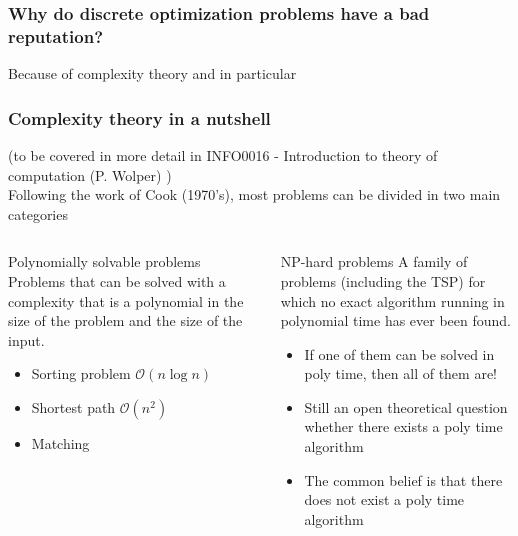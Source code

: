 \documentclass[9pt,handout]{beamer}
\begin{document}
\begin{frame}
\frametitle{Why do discrete optimization problems have a bad reputation?}
Because of complexity theory and in particular 
\vspace{2cm}

\begin{center}
\begin{huge}
\end{huge}
\end{center}
\end{frame}
\begin{frame}
\frametitle{Complexity theory in a nutshell}
(to be covered in more detail in INFO0016 - Introduction to theory of computation (P. Wolper) )\\
Following the work of Cook (1970's), most problems can be divided in two main categories
\begin{columns}[t]
\begin{column}{5.25cm}
\begin{exampleblock}{Polynomially solvable problems}
Problems that can be solved with a complexity
that is a polynomial in the \alert{size} of the problem
and the \alert{size of the input}.\bigskip
\begin{itemize}
\item<1-> Sorting problem $\mathcal O(n\log n)$
\item<1-> Shortest path $\mathcal O(n^2)$
\item<1-> Matching 
\end{itemize}
\end{exampleblock}
\end{column}
\begin{column}{5.25cm}
\begin{alertblock}{NP-hard problems}
A family of problems (including the TSP) for which no exact algorithm
running in polynomial time has ever been found.
\begin{itemize}
\item<2-> If one of them can be solved in poly time, then all of them are!
\item<2-> Still an open theoretical question whether there exists a poly time algorithm
\item<2-> The common belief is that there does not exist a poly time algorithm
\end{itemize}
\end{alertblock}
\end{column}
\end{columns}
\end{frame}
\end{document}
